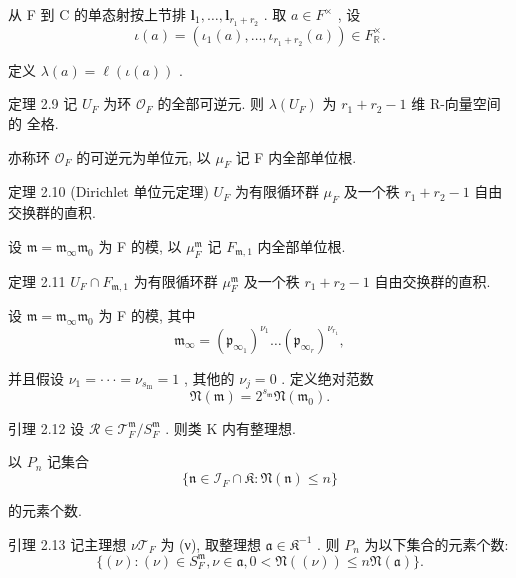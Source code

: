 \documentclass[]{article}
\begin{document}
{从 F 到 C 的单态射按上节排 $\boldsymbol { l } _ { 1 } , \ldots , \boldsymbol { l } _ { r _ { 1 } + r _ { 2 } }$ . 取 $a \in F ^ { \times }$ , 设$$
\iota (a) = (\iota_ {1} (a), \dots , \iota_ {r _ {1} + r _ {2}} (a)) \in F _ {\mathbb {R}} ^ {\times}.
$$

定义 $\lambda ( a ) = \ell ( \iota ( a ) )$ . 

定理 2.9 记 $U _ { F }$ 为环 ${ \mathcal { O } } _ { F }$ 的全部可逆元. 则 $\lambda ( U _ { F } )$ 为 $r _ { 1 } + r _ { 2 } - 1$ 维 R-向量空间的 全格.  

亦称环 ${ \mathcal { O } } _ { F }$ 的可逆元为单位元, 以 $\mu _ { F }$ 记 F 内全部单位根. 

定理 2.10 (Dirichlet 单位元定理) $U _ { F }$ 为有限循环群 $\mu _ { F }$ 及一个秩 $r _ { 1 } + r _ { 2 } - 1$ 自由 交换群的直积. 

设 ${ \mathfrak { m } } = { \mathfrak { m } } _ { \infty } { \mathfrak { m } } _ { 0 }$ 为 F 的模, 以 $\mu _ { F } ^ { \mathfrak { m } }$ 记 $F _ { \mathfrak { m } , 1 }$ 内全部单位根. 

定理 2.11 $U _ { F } \cap F _ { \mathfrak { m } , 1 }$ 为有限循环群 $\mu _ { F } ^ { \mathfrak { m } }$ 及一个秩 $r _ { 1 } + r _ { 2 } - 1$ 自由交换群的直积. 

设 ${ \mathfrak { m } } = { \mathfrak { m } } _ { \infty } { \mathfrak { m } } _ { 0 }$ 为 F 的模, 其中 $$
\mathfrak {m} _ {\infty} = \left(\mathfrak {p} _ {\infty_ {1}}\right) ^ {\nu_ {1}} \dots \left(\mathfrak {p} _ {\infty_ {r}}\right) ^ {\nu_ {r _ {1}}},
$$

并且假设 $\nu _ { 1 } = \cdot \cdot \cdot = \nu _ { s _ { \mathrm { m } } } = 1$ , 其他的 $\nu _ { j } = 0$ . 定义绝对范数$$
\mathfrak {N} (\mathfrak {m}) = 2 ^ {s _ {\mathfrak {m}}} \mathfrak {N} (\mathfrak {m} _ {0}).
$$

引理 2.12 设 $\mathscr { R } \in \mathcal { T } _ { F } ^ { \mathfrak { m } } / S _ { F } ^ { \mathfrak { m } }$ . 则类 K 内有整理想. 

以 $P _ { n }$ 记集合$$
\{\mathfrak {n} \in \mathcal {I} _ {F} \cap \mathfrak {K}: \mathfrak {N} (\mathfrak {n}) \leqslant n \}
$$

的元素个数. 

引理 2.13 记主理想 $\nu \mathcal { T } _ { F }$ 为 (ν), 取整理想 ${ \mathfrak { a } } \in { \mathfrak { K } } ^ { - 1 }$ . 则 $P _ { n }$ 为以下集合的元素个数: $$
\big \{(\nu): (\nu) \in S _ {F} ^ {\mathfrak {m}}, \nu \in \mathfrak {a}, 0 <   \mathfrak {N} ((\nu)) \leqslant n \mathfrak {N} (\mathfrak {a}) \big \}.
$$

}
\end{document}
